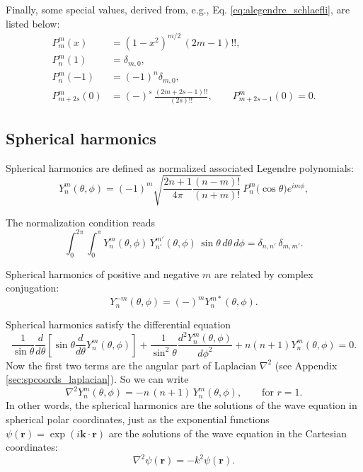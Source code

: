 \documentclass[11pt]{article}
\newcommand{\vct}[1]{\boldsymbol{\mathbf{#1}}}
\newcommand{\vr}{\vct{r}}
\newcommand{\vk}{\vct{k}}
\begin{document}
Finally, some special values, derived from, e.g., Eq. \eqref{eq:alegendre_schlaefli}, are listed below:
\begin{align}
  P_m^m(x)    &= (1 - x^2)^{m/2} \, (2 m - 1)!!,
  \label{eq:alegendre_mm} \\
  P_n^m(1)    &= \delta_{m, 0},
  \label{eq:alegendre_1} \\
  P_n^m(-1)   &= (-1)^n \delta_{m, 0},
  \label{eq:alegendre_neg1} \\
  P_{m+2s}^m(0) &= (-)^s \, \frac{ (2m + 2s - 1)!! }{ (2s)!! },
  \qquad
  P_{m+2s-1}^m(0) = 0.
  \label{eq:alegendre_0}
\end{align}



\subsection{Spherical harmonics}



Spherical harmonics are defined as
normalized associated Legendre polynomials:
\begin{equation}
  Y_n^{m}(\theta, \phi)
=
  (-1)^{m}
  \sqrt{
    \frac{ 2 n + 1 } { 4 \pi }
    \frac{ (n - m)! } { (n + m)! }
  }
  \,
  P_{n}^{m}\bigl( \cos\theta \bigr) e^{i m \phi},
  \label{eq:Ynm}
\end{equation}

The normalization condition reads
\begin{equation}
  \int_0^{2\pi} \int_0^\pi
  Y_n^{m}(\theta, \phi) \, Y_{n'}^{m'}(\theta, \phi)
  \, \sin\theta \, d\theta \, d\phi
  = \delta_{n, n'} \, \delta_{m, m'}.
  \label{eq:Ynm_orthonorm}
\end{equation}

Spherical harmonics of positive and negative $m$ are
related by complex conjugation:
\begin{equation}
  Y_n^{-m}(\theta, \phi) = (-)^m Y_n^{m*}(\theta, \phi).
\end{equation}

Spherical harmonics satisfy the differential equation
\begin{equation}
  \frac{1}{\sin\theta}
  \frac{d}{d\theta}
  \left[
    \sin\theta
    \frac{d}{d\theta}
    Y_n^m(\theta, \phi)
  \right]
  +
  \frac{1}{\sin^2\theta}
  \frac{d^2 Y_n^m(\theta, \phi)}{d\phi^2}
  +
  n (n + 1) Y_n^m(\theta, \phi)
  = 0.
  \label{eq:Ynm_diffeq}
\end{equation}
%
Now the first two terms are the angular part of
Laplacian $\nabla^2$ (see Appendix \ref{sec:spcoords_laplacian}).
%
So we can write
\begin{equation}
  \nabla^2 Y_n^m(\theta, \phi)
  =
  -n \,(n + 1) \, Y_n^m(\theta, \phi),
  \qquad \mbox{for $r = 1$}.
  \label{eq:Ynm_diffeq2}
\end{equation}
%
In other words,
the spherical harmonics
are the solutions of the wave equation
in spherical polar coordinates,
just as the exponential functions $\psi(\vr) = \exp(i\vk\cdot\vr)$
are the solutions of the wave equation
in the Cartesian coordinates:
\[
  \nabla^2 \psi(\vr) = -k^2 \psi(\vr).
\]
\end{document}
